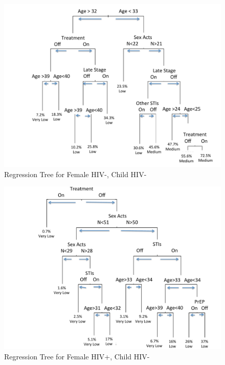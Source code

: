 \documentclass[11pt]{nih_mod}
\begin{document}
\begin{figure}[H]
  \begin{center}
    \includegraphics[width=7.5in]{figures/Tree_Outcome1_09Sept2012.pdf}
  \end{center}
  \caption{Regression Tree for Female HIV-, Child HIV-}
  \label{Fig:TreeOutcome1}
\end{figure}

\begin{figure}[H]
  \begin{center}
    \includegraphics[width=7.5in]{figures/Tree_Outcome2_09Sept2012.pdf}
  \end{center}
  \caption{Regression Tree for Female HIV+, Child HIV-}
  \label{Fig:TreeOutcome2}
\end{figure}
\end{document}
